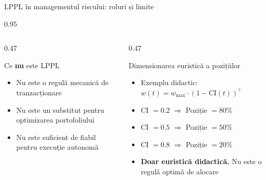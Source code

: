 \documentclass[9pt, aspectratio=169, t]{beamer}
\begin{document}
\begin{frame}{LPPL în managementul riscului: roluri și limite}
\begin{cminipage}{0.95\textwidth}
{\begin{columns}[T]
\begin{column}{0.47\textwidth}
            \begin{alertblock}{Ce \textbf{nu} este LPPL}
                \begin{itemize}\setlength{\itemsep}{0pt}
                    \item Nu este o regulă mecanică de tranzacționare
                    \item Nu este un substitut pentru optimizarea portofoliului
                    \item Nu este suficient de fiabil pentru execuție autonomă
                \end{itemize}
            \end{alertblock}
        \end{column}
        \begin{column}{0.47\textwidth}
            \begin{block}{Dimensionarea euristică a pozițiilor}
                \begin{itemize}\setlength{\itemsep}{0pt}
                    \item Exemplu didactic: $w(t) = w_{\max} \cdot (1 - \text{CI}(t))^\gamma$
                    \item CI $= 0.2$ $\Rightarrow$ Poziție $= 80\%$
                    \item CI $= 0.5$ $\Rightarrow$ Poziție $= 50\%$
                    \item CI $= 0.8$ $\Rightarrow$ Poziție $= 20\%$
                    \item \textbf{Doar euristică didactică.} Nu este o regulă optimă de alocare
                \end{itemize}
            \end{block}
        \end{column}
    \end{columns}
    }
    \end{cminipage}
\end{frame}
\end{document}
